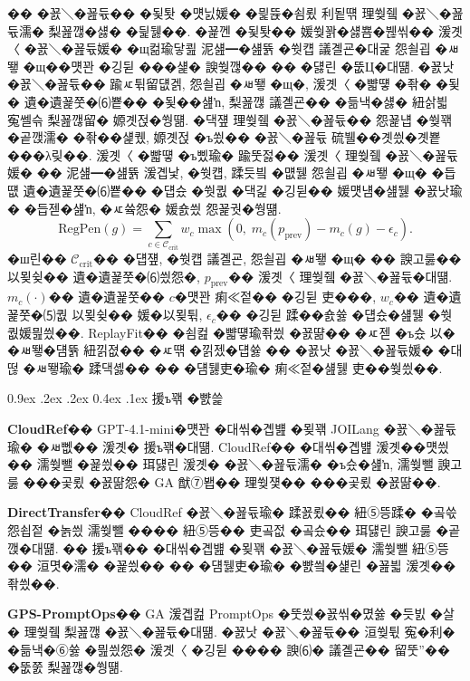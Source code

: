 \documentclass[10pt,twocolumn]{article}
\makeatletter
\renewcommand{\subsection}{\@startsection{subsection}{2}{\z@}%
{0.9ex \@plus .2ex \@minus .2ex}%
{0.4ex \@plus .1ex}%
{\normalfont\normalsize\bfseries}}
\makeatother
\begin{document}
�� �꾨＼�꾪듃�� �됯퇏 �먯닔媛� �믩뜑�쇰룄 利됱떆 理쒖쥌 �꾨＼�꾪듃濡� 梨꾪깮�섏� �딅뒗��. �꾩껜 �됯퇏�� 媛쒖꽑�섏뿀�붾씪�� 湲곗〈 �꾨＼�꾪듃媛� �щ컮瑜닿쾶 泥섎━�섎뜕 �쒓컙 議곌굔�대굹 怨쇨굅 �ㅽ뙣 �щ��먯꽌 �깅뒫 ���섍� 諛쒖깮�� �� �덇린 �뚮Ц�대떎. �꾨낫 �꾨＼�꾪듃�� 踰ㅼ튂留덊겕, 怨쇨굅 �ㅽ뙣 �щ�, 湲곗〈 �뺣떟 �좎� �됯� 遺�遺꾩쭛�⑹뿉�� �됯��섎ŉ, 梨꾪깮 議곌굔�� �듦낵�섏� 紐삵븳 寃쎌슦 梨꾪깮留� 嫄곗젅�쒕떎. �댁쟾 理쒖쥌 �꾨＼�꾪듃�� 怨꾩냽 �쒖꽦 �곹깭濡� �좎��섍퀬, 嫄곗젅 �ъ쑀�� �꾨＼�꾪듃 硫뷀��곗씠�곗뿉 ���λ맂��. 湲곗〈 �뺣떟 �ъ삤瑜� 踰뚯젏�� 湲곗〈 理쒖쥌 �꾨＼�꾪듃媛� �� 泥섎━�섎뜕 湲곕낯, �쒓컙, 蹂듯빀 �먮뒗 怨쇨굅 �ㅽ뙣 �щ� �듭떖 遺�遺꾩쭛�⑹뿉�� �덉슜 �쒓퀎 �댁긽 �깅뒫�� 媛먯냼�섎뒗 �꾨낫瑜� �듭젣�섎ŉ, �ㅼ쓬怨� 媛숈씠 怨꾩궛�쒕떎.
\begin{equation}
\mathrm{RegPen}(g)
= \sum_{c\in\mathcal{C}_{\mathrm{crit}}}
w_c \max\!\left(0,\; m_c(p_{\mathrm{prev}}) - m_c(g) - \epsilon_c\right).
\end{equation}
�ш린�� $\mathcal{C}_{\mathrm{crit}}$�� �덉쟾, �쒓컙 議곌굔, 怨쇨굅 �ㅽ뙣 �щ� �� 諛고룷�� 以묒슂�� 遺�遺꾩쭛�⑹씠怨�, $p_{\mathrm{prev}}$�� 湲곗〈 理쒖쥌 �꾨＼�꾪듃�대떎. $m_c(\cdot)$�� 遺�遺꾩쭛�� $c$�먯꽌 痢≪젙�� �깅뒫 吏���, $w_c$�� 遺�遺꾩쭛�⑸퀎 以묒슂�� 媛�以묒튂, $\epsilon_c$�� �깅뒫 蹂��숈쓣 �덉슜�섎뒗 �쒓퀎媛믪씠��. ReplayFit�� �쇰컲 �뺣떟瑜좎씠 �꾨땲�� �ㅼ젣 �ъ슜 以� �ㅽ뙣�덈뜕 紐낅졊�� �ㅼ떆 �낅젰�덉쓣 �� �꾨낫 �꾨＼�꾪듃媛� �대떦 �ㅽ뙣瑜� 蹂댁셿�� �� �덈뒗吏�瑜� 痢≪젙�섎뒗 吏��쒖씠��.

\subsection{援ъ꽦 �뺤쓽}

\textbf{CloudRef}�� GPT-4.1-mini�먯꽌 �대씪�곕뱶 �묒꽦 JOILang �꾨＼�꾪듃瑜� �ㅽ뻾�� 湲곗� 援ъ꽦�대떎. CloudRef�� �대씪�곕뱶 湲곗��먯씠�� 濡쒖뺄 �꾩씠�� 珥덇린 湲곗� �꾨＼�꾪듃濡� �ъ슜�섎ŉ, 濡쒖뺄 諛고룷 ���곷룄 �꾨땲怨� GA 猷⑦봽�� 理쒖쟻�� ���곷룄 �꾨땲��.

\textbf{DirectTransfer}�� CloudRef �꾨＼�꾪듃瑜� 蹂꾨룄�� 紐⑤뜽蹂� �곸쓳 怨쇱젙 �놁씠 濡쒖뺄 ���� 紐⑤뜽�� 吏곸젒 �곸슜�� 珥덇린 諛고룷 �곹깭�대떎. �� 援ъ꽦�� �대씪�곕뱶 �묒꽦 �꾨＼�꾪듃媛� 濡쒖뺄 紐⑤뜽�� 洹몃�濡� �꾩씠�� �� �덈뒗吏�瑜� �뺤씤�섍린 �꾪븳 湲곗��좎씠��.

\textbf{GPS-PromptOps}�� GA 湲곕컲 PromptOps �뚯씠�꾨씪�몄쓣 �듯빐 �살� 理쒖쥌 梨꾪깮 �꾨＼�꾪듃�대떎. �꾨낫 �꾨＼�꾪듃�� 洹쒖튃 寃�利� �듦낵�⑥쓣 �믪씠怨� 湲곗〈 �깅뒫 ���� 諛⑹� 議곌굔�� 留뚯”�� �뚮쭔 梨꾪깮�쒕떎.
\end{document}
